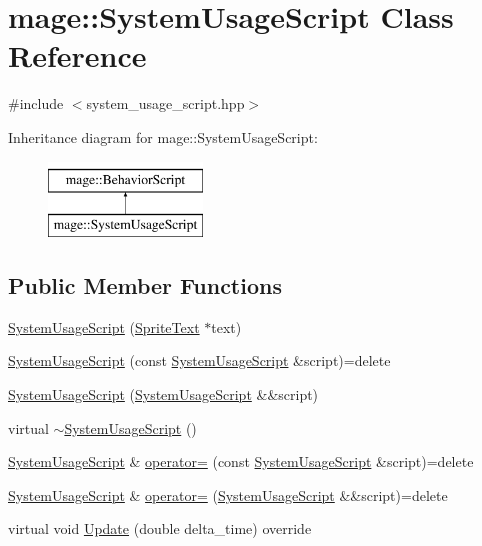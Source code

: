 \hypertarget{classmage_1_1_system_usage_script}{}\section{mage\+:\+:System\+Usage\+Script Class Reference}
\label{classmage_1_1_system_usage_script}


{\ttfamily \#include $<$system\+\_\+usage\+\_\+script.\+hpp$>$}

Inheritance diagram for mage\+:\+:System\+Usage\+Script\+:\begin{figure}[H]
\begin{center}
\leavevmode
\includegraphics[height=2.000000cm]{classmage_1_1_system_usage_script}
\end{center}
\end{figure}
\subsection*{Public Member Functions}
\begin{DoxyCompactItemize}
\item 
\hyperlink{classmage_1_1_system_usage_script_a4a94f0c3bae3ba17931bddc5919d547a}{System\+Usage\+Script} (\hyperlink{classmage_1_1_sprite_text}{Sprite\+Text} $\ast$text)
\item 
\hyperlink{classmage_1_1_system_usage_script_a3fccc6dda27ede785fb9c45360e53bb0}{System\+Usage\+Script} (const \hyperlink{classmage_1_1_system_usage_script}{System\+Usage\+Script} \&script)=delete
\item 
\hyperlink{classmage_1_1_system_usage_script_a013e7c6510442421d74bffa3b2f810fe}{System\+Usage\+Script} (\hyperlink{classmage_1_1_system_usage_script}{System\+Usage\+Script} \&\&script)
\item 
virtual \hyperlink{classmage_1_1_system_usage_script_ac4c71b831e5cd5d6a5db8783150b76cc}{$\sim$\+System\+Usage\+Script} ()
\item 
\hyperlink{classmage_1_1_system_usage_script}{System\+Usage\+Script} \& \hyperlink{classmage_1_1_system_usage_script_a3ca814599a30991f3e6068cec2b876df}{operator=} (const \hyperlink{classmage_1_1_system_usage_script}{System\+Usage\+Script} \&script)=delete
\item 
\hyperlink{classmage_1_1_system_usage_script}{System\+Usage\+Script} \& \hyperlink{classmage_1_1_system_usage_script_ad9c1a2f19c6d79adbd32789e479e1427}{operator=} (\hyperlink{classmage_1_1_system_usage_script}{System\+Usage\+Script} \&\&script)=delete
\item 
virtual void \hyperlink{classmage_1_1_system_usage_script_af7189c6e81dabfe077710ed9f3c7cd09}{Update} (double delta\+\_\+time) override
\end{DoxyCompactItemize}

